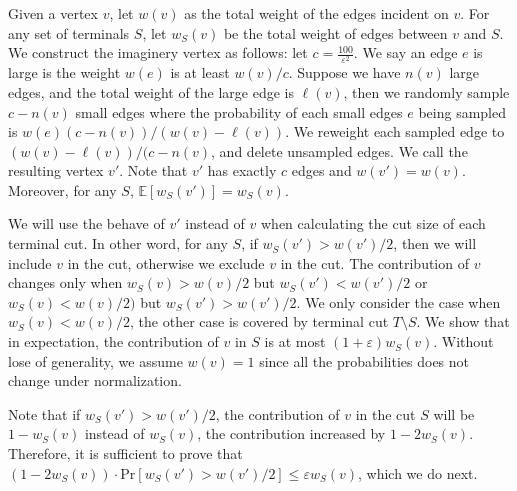 \documentclass[11pt]{article}
\theoremstyle{definition}
\newcommand{\eps}{{\varepsilon}}
\def\pr#1{\mathrm{Pr}\left[ #1 \right]}
\def\ex#1{{\mathbb{E}}\left[ #1 \right]}
\begin{document}
\iffalse
Given a vertex $v$, let $w(v)$ as the total weight of the edges incident on $v$. For any set of terminals $S$, let $w_S(v)$ be the total weight of edges between $v$ and $S$. We construct the imaginery vertex as follows: let $c = \frac{100}{\eps^2}$. We say an edge $e$ is large is the weight $w(e)$ is at least $w(v)/c$. Suppose we have $n(v)$ large edges, and the total weight of the large edge is $\ell(v)$, then we randomly sample $c-n(v)$ small edges where the probability of each small edges $e$ being sampled is $w(e)(c-n(v))/(w(v)-\ell(v))$. We reweight each sampled edge to $(w(v)-\ell(v))/(c-n(v)$, and delete unsampled edges. We call the resulting vertex $v'$. Note that $v'$ has exactly $c$ edges and $w(v')=w(v)$. Moreover, for any $S$, $\ex{w_S(v')}=w_S(v)$.

We will use the behave of $v'$ instead of $v$ when calculating the cut size of each terminal cut. In other word, for any $S$, if $w_S(v')>w(v')/2$, then we will include $v$ in the cut, otherwise we exclude $v$ in the cut. The contribution of $v$ changes only when $w_S(v)>w(v)/2$ but $w_S(v')<w(v')/2$ or $w_S(v)<w(v)/2)$ but $w_S(v')>w(v')/2$. We only consider the case when $w_S(v)<w(v)/2$, the other case is covered by terminal cut $T \setminus S$. We show that in expectation, the contribution of $v$ in $S$ is at most $(1+\eps)w_S(v)$. Without lose of generality, we assume $w(v) = 1$ since all the probabilities does not change under normalization.

Note that if $w_S(v')>w(v')/2$, the contribution of $v$ in the cut $S$ will be $1-w_S(v)$ instead of $w_S(v)$, the contribution increased by $1-2w_S(v)$. Therefore, it is sufficient to prove that $(1-2w_S(v)) \cdot \pr{w_S(v')>w(v')/2} \le \eps w_S(v)$, which we do next. 
\end{document}
